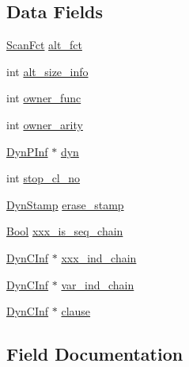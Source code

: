 \subsection*{Data Fields}
\begin{DoxyCompactItemize}
\item 
\hyperlink{dynam__supp_8h_a9ce8f2e1c3c17643fc4a7874b633104e}{Scan\+Fct} \hyperlink{structDynScan_acfa1d047b819d2941ee149649705267a}{alt\+\_\+fct}
\item 
int \hyperlink{structDynScan_add62e7961d11ce60357eb13181e762b0}{alt\+\_\+size\+\_\+info}
\item 
int \hyperlink{structDynScan_a2e6f2cb912f0477854e0cab2bd4f9f0a}{owner\+\_\+func}
\item 
int \hyperlink{structDynScan_a55d99dfd20f733fb1ede548b7accd548}{owner\+\_\+arity}
\item 
\hyperlink{dynam__supp_8h_abf8c639d74e3a538cb5256ede033af03}{Dyn\+P\+Inf} $\ast$ \hyperlink{structDynScan_a2c4d20f447ace62db674692a4724ce0e}{dyn}
\item 
int \hyperlink{structDynScan_a786342f885eab9162a783e6633fefa84}{stop\+\_\+cl\+\_\+no}
\item 
\hyperlink{dynam__supp_8h_ae67d7fd7d828834bf168a2bccc22643c}{Dyn\+Stamp} \hyperlink{structDynScan_a482a71d0fe57d0a6118a68a1f94e0c4a}{erase\+\_\+stamp}
\item 
\hyperlink{bool_8h_afdcfe6db5bea87bd493a3fe2c513d5ef}{Bool} \hyperlink{structDynScan_acd70059e162c998780954a78427ad3ee}{xxx\+\_\+is\+\_\+seq\+\_\+chain}
\item 
\hyperlink{dynam__supp_8h_a3be3c527fb36e120ec36f999fb1a12d3}{Dyn\+C\+Inf} $\ast$ \hyperlink{structDynScan_a657dfdeff11a3a52923f165bcf9bc6fd}{xxx\+\_\+ind\+\_\+chain}
\item 
\hyperlink{dynam__supp_8h_a3be3c527fb36e120ec36f999fb1a12d3}{Dyn\+C\+Inf} $\ast$ \hyperlink{structDynScan_a01058a30b112e62e5768ead8055f6f7f}{var\+\_\+ind\+\_\+chain}
\item 
\hyperlink{dynam__supp_8h_a3be3c527fb36e120ec36f999fb1a12d3}{Dyn\+C\+Inf} $\ast$ \hyperlink{structDynScan_ac04b24fb81aec5128d42e5b79123cfc8}{clause}
\end{DoxyCompactItemize}


\subsection{Field Documentation}
